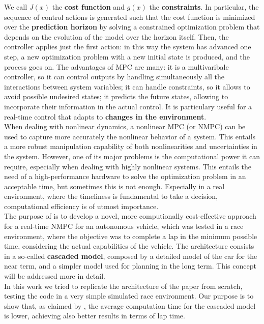 \documentclass[a4paper, onecolumn, 12pt]{article}
\begin{document}
We call $J(x)$ the \textbf{cost function} and $g(x)$ the \textbf{constraints}.
In particular, the sequence of control actions is generated such that the cost
function is minimized over the \textbf{prediction horizon} by solving a
constrained optimization problem that depends on the evolution of the model over
the horizon itself. Then, the controller applies just the first action: in this
way the system has advanced one step, a new optimization problem with a new
initial state is produced, and the process goes on. The advantages of MPC are
many: it is a multivaribale controller, so it can control outputs by handling
simultaneously all the interactions between system variables; it can handle
constraints, so it allows to avoid possible undesired states; it predicts the
future states, allowing to incorporate their information in the actual control.
It is particulary useful for a real-time control that adapts to \textbf{changes
in the environment}.\\
When dealing with nonlinear dynamics, a nonlinear MPC (or NMPC) can be used to
capture more accurately the nonlinear behavior of a system. This entails a more
robust manipulation capability of both nonlinearities and uncertainties in the
system. However, one of its major problems is the computational power it can
require, especially when dealing with highly nonlinear systems. This entails the
need of a high-performance hardware to solve the optimization problem in an
acceptable time, but sometimes this is not enough. Especially in a real
environment, where the timeliness is fundamental to take a decision,
computational efficiency is of utmost importance.\\
The purpose of \cite{paper} is to develop a novel, more computionally
cost-effective approach for a real-time NMPC for an autonomous vehicle, which
was tested in a race environment, where the objective was to complete a lap in
the minimum possible time, considering the actual capabilities of the vehicle.
The architecture consists in a so-called \textbf{cascaded model}, composed by a
detailed model of the car for the near term, and a simpler model used for
planning in the long term. This concept will be addressed more in detail.\\
In this work we tried to replicate the architecture of the paper from scratch,
testing the code in a very simple simulated race environment. Our purpose is to
show that, as claimed by \cite{paper}, the average computation time for the
cascaded model is lower, achieving also better results in terms of lap time.
\end{document}
